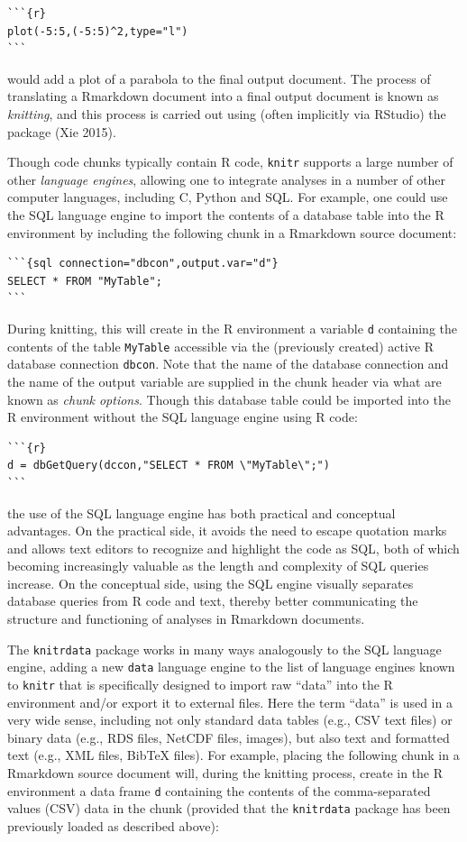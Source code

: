 \begin{verbatim}
```{r}
plot(-5:5,(-5:5)^2,type="l")
```
\end{verbatim}

would add a plot of a parabola to the final output document. The process of translating a Rmarkdown document into a final output document is known as \emph{knitting}, and this process is carried out using (often implicitly via RStudio) the  package (Xie 2015).

Though code chunks typically contain R code, \texttt{knitr} supports a large number of other \emph{language engines}, allowing one to integrate analyses in a number of other computer languages, including C, Python and SQL. For example, one could use the SQL language engine to import the contents of a database table into the R environment by including the following chunk in a Rmarkdown source document:

\begin{verbatim}
```{sql connection="dbcon",output.var="d"}
SELECT * FROM "MyTable";
```
\end{verbatim}

During knitting, this will create in the R environment a variable \texttt{d} containing the contents of the table \texttt{MyTable} accessible via the (previously created) active R database connection \texttt{dbcon}. Note that the name of the database connection and the name of the output variable are supplied in the chunk header via what are known as \emph{chunk options}. Though this database table could be imported into the R environment without the SQL language engine using R code:

\begin{verbatim}
```{r}
d = dbGetQuery(dccon,"SELECT * FROM \"MyTable\";")
```
\end{verbatim}

the use of the SQL language engine has both practical and conceptual advantages. On the practical side, it avoids the need to escape quotation marks and allows text editors to recognize and highlight the code as SQL, both of which becoming increasingly valuable as the length and complexity of SQL queries increase. On the conceptual side, using the SQL engine visually separates database queries from R code and text, thereby better communicating the structure and functioning of analyses in Rmarkdown documents.

The \texttt{knitrdata} package works in many ways analogously to the SQL language engine, adding a new \texttt{data} language engine to the list of language engines known to \texttt{knitr} that is specifically designed to import raw ``data'' into the R environment and/or export it to external files. Here the term ``data'' is used in a very wide sense, including not only standard data tables (e.g., CSV text files) or binary data (e.g., RDS files, NetCDF files, images), but also text and formatted text (e.g., XML files, BibTeX files). For example, placing the following chunk in a Rmarkdown source document will, during the knitting process, create in the R environment a data frame \texttt{d} containing the contents of the comma-separated values (CSV) data in the chunk (provided that the \texttt{knitrdata} package has been previously loaded as described above):

